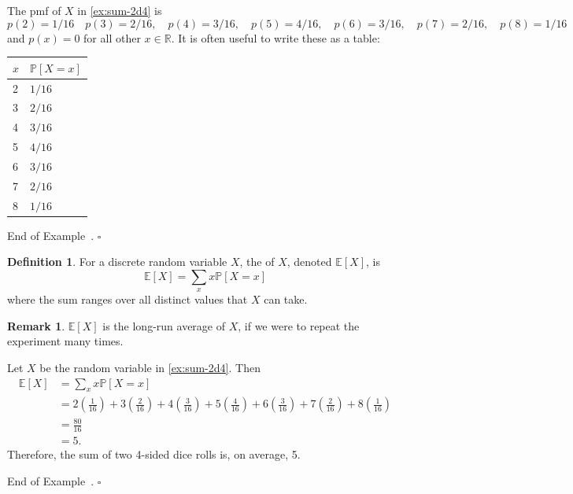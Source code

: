 \documentclass[10pt]{article}
\theoremstyle{definition}
\newtheorem{definition}[theorem]{Definition}
\newtheorem{remark}[theorem]{Remark}
\newtheorem{example}[theorem]{Example}
\renewenvironment{example}
{\begin{oldexample}}
  {\par\smallskip\hfill   End of Example~\theexample. $\square$    \par\end{oldexample}}
\newcommand{\1}[1]{\textbf{1}_{\left[#1\right]}} %
\def\R{\mathbb{R}} %
\def\E{\mathbb{E}} %
\def\P{\mathbb{P}} %
\newcommand{\dempfcolor}[1]{{\color{RoyalBlue}#1}}
\newcommand{\demph}[1]{\dempfcolor{{\sl \textbf{#1}}}}
\begin{document}
\begin{example}
  The pmf of $X$ in \cref{ex:sum-2d4} is
  \begin{equation*}
    p(2) = 1/16 \quad p(3) = 2/16, \quad p(4) = 3/16, \quad p(5) = 4/16, \quad p(6) = 3/16, \quad p(7)=2/16, \quad p(8) = 1/16
  \end{equation*}
  and $p(x)=0$ for all other $x\in \R$. It is often useful to write these as a
  table:
  \begin{center}
    \begin{tabular}{l|l}
      $x$ & $\P[X=x]$ \\ \hline
      2   & $1/16$     \\
      3   & $2/16$     \\
      4   & $3/16$     \\
      5   & $4/16$    \\
      6   & $3/16$    \\
      7   & $2/16$    \\
      8   & $1/16$    
    \end{tabular}
  \end{center}
\end{example}

\begin{definition}
  For a discrete random variable $X$, the \demph{expected value} of $X$,
  denoted $\E\left[X \right]$, is
  \begin{equation*}
    \E\left[X \right] = \sum_{x}x \P\left[X=x \right] 
  \end{equation*}
  where the sum ranges over all distinct values that $X$ can take.
\end{definition}

\begin{remark}
  $\E\left[X \right]$ is the long-run average of $X$, if we were to repeat the
  experiment many times.
\end{remark}

\begin{example}
  Let $X$ be the random variable in \cref{ex:sum-2d4}. Then
  \begin{align*}
    \E\left[X \right] 
    &= \sum_{x}x \P\left[X=x \right]\\
    &=2 \left( \frac{1}{16} \right) +
      3 \left( \frac{2}{16} \right) +
      4 \left( \frac{3}{16} \right) +  
      5 \left( \frac{4}{16} \right) +  
      6 \left( \frac{3}{16} \right) +  
      7 \left( \frac{2}{16} \right) +  
      8 \left( \frac{1}{16} \right)\\
    &= \frac{80}{16}\\
    &=5.
  \end{align*}
  Therefore, the sum of two 4-sided dice rolls is, on average, 5.
\end{example}
\end{document}
